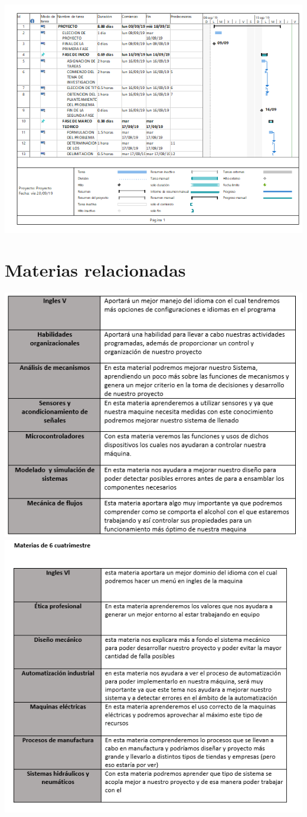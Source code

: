 \documentclass[12pt,a4paper]{report}
\begin{document}
\includegraphics[scale=1]{Diagrama.png} 
\section{Materias relacionadas}
\includegraphics[scale=1]{Materias.png} \\
\includegraphics[scale=1]{Materias 1.png} 
\end{document}
